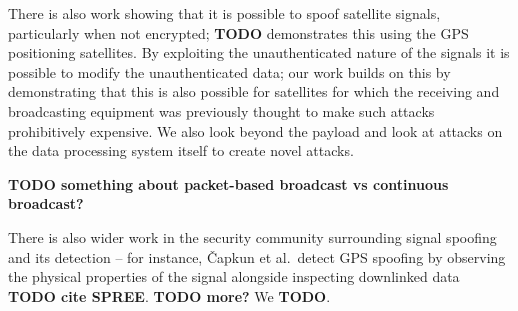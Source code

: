 There is also work showing that it is possible to spoof satellite signals, particularly when not encrypted; \textbf{TODO} demonstrates this using the GPS positioning satellites.
By exploiting the unauthenticated nature of the signals it is possible to modify the unauthenticated data; our work builds on this by demonstrating that this is also possible for satellites for which the receiving and broadcasting equipment was previously thought to make such attacks prohibitively expensive.
We also look beyond the payload and look at attacks on the data processing system itself to create novel attacks.

\textbf{TODO something about packet-based broadcast vs continuous broadcast?}

There is also wider work in the security community surrounding signal spoofing and its detection -- for instance, Čapkun et al.\ detect GPS spoofing by observing the physical properties of the signal alongside inspecting downlinked data \textbf{TODO cite SPREE}.
\textbf{TODO more?}
We \textbf{TODO}.

